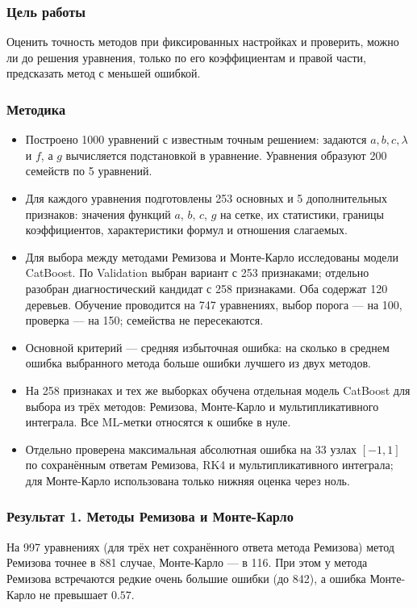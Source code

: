 \documentclass[14pt,a4paper]{extarticle}
\begin{document}
\subsubsection*{Цель работы}
Оценить точность методов при фиксированных настройках и проверить,
можно ли до решения уравнения, только по его коэффициентам и правой
части, предсказать метод с меньшей ошибкой.

\subsubsection*{Методика}
\begin{itemize}
\item Построено 1000 уравнений с известным точным решением: задаются
$a,b,c,\lambda$ и $f$, а $g$ вычисляется подстановкой в уравнение.
Уравнения образуют 200 семейств по 5 уравнений.
\item Для каждого уравнения подготовлены 253 основных и 5 дополнительных
признаков: значения функций $a$, $b$, $c$, $g$ на сетке, их статистики,
границы коэффициентов, характеристики формул и отношения слагаемых.
\item Для выбора между методами Ремизова и Монте-Карло исследованы
модели CatBoost. По Validation выбран вариант с 253 признаками;
отдельно разобран диагностический кандидат с 258 признаками. Оба
содержат 120 деревьев. Обучение проводится на 747 уравнениях, выбор
порога --- на 100, проверка --- на 150; семейства не пересекаются.
\item Основной критерий --- средняя избыточная ошибка: на сколько
в среднем ошибка выбранного метода больше ошибки лучшего из двух методов.
\item На 258 признаках и тех же выборках обучена отдельная модель
CatBoost для выбора из трёх методов: Ремизова, Монте-Карло
и мультипликативного интеграла. Все ML-метки относятся к ошибке в нуле.
\item Отдельно проверена максимальная абсолютная ошибка на 33 узлах
$[-1,1]$ по сохранённым ответам Ремизова, RK4 и мультипликативного
интеграла; для Монте-Карло использована только нижняя оценка через ноль.
\end{itemize}

\subsubsection*{Результат 1. Методы Ремизова и Монте-Карло}
На 997 уравнениях (для трёх нет сохранённого ответа метода Ремизова)
метод Ремизова точнее в 881 случае, Монте-Карло --- в 116. При этом
у метода Ремизова встречаются редкие очень большие ошибки (до 842),
а ошибка Монте-Карло не превышает $0.57$.
\end{document}
